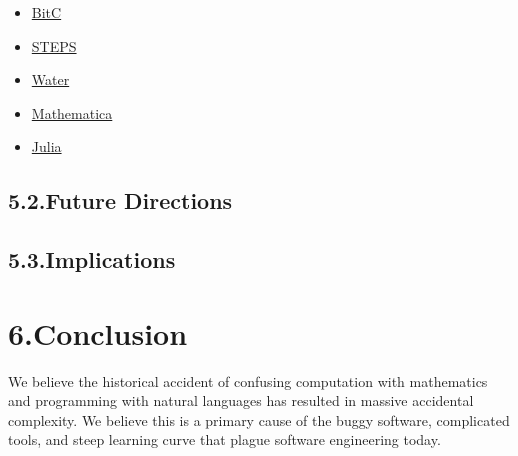 \documentclass[preprint]{{acmart}}
\begin{document}
\begin{itemize}[noitemsep,topsep=\mdcompacttopsep]%

\item{}\href{www.cs.jhu.edu/~swaroop/aplas.pdf}{BitC}%

\item{}\href{http://www.vpri.org/pdf/tr2008004_steps08.pdf}{STEPS}%

\item{}\href{http://www.informit.com/articles/article.aspx?p=27567}{Water}%

\item{}\href{https://mathematica.stackexchange.com/questions/2335/metaprogramming-in-mathematica}{Mathematica}%

\item{}\href{https://julialang.org}{Julia}%
\end{itemize}%

\subsection{5.2.\hspace*{0.5em}Future Directions}\label{sec-future-directions}%

\subsection{5.3.\hspace*{0.5em}Implications}\label{sec-implications}%

\section{6.\hspace*{0.5em}Conclusion}\label{sec-conclusion}%

\noindent{}We believe the historical accident of confusing computation with
mathematics and programming with natural languages has resulted in
massive accidental complexity. We believe this is a primary cause of the
buggy software, complicated tools, and steep learning curve that plague software
engineering today.%
\end{document}
